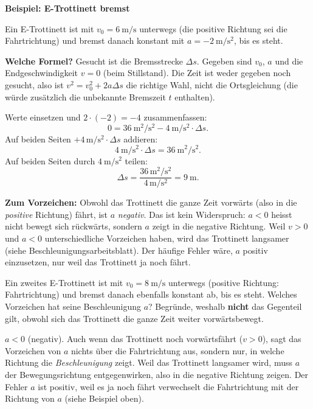 \documentclass[addpoints,11pt,a4paper]{exam}
\newenvironment{beispielbox}[1][Beispiel]{%
  \par\addvspace{10pt}\noindent\textbf{#1}\par\smallskip\noindent
}{%
  \par\addvspace{10pt}
}
\newlength{\antwortraumlen}
\newcommand{\Antwortraum}[1]{%
  \pgfmathsetlength{\antwortraumlen}{#1*2.5cm}%
  \begin{answerbox}
    \rule{0pt}{\antwortraumlen}%
  \end{answerbox}%
}
\begin{document}
\begin{beispielbox}[Beispiel: E-Trottinett bremst]
Ein E-Trottinett ist mit $v_0=\SI{6}{\meter\per\second}$ unterwegs (die
positive Richtung sei die Fahrtrichtung) und bremst danach konstant mit
$a=-\SI{2}{\meter\per\second\squared}$, bis es steht.

\textbf{Welche Formel?} Gesucht ist die Bremsstrecke $\Delta s$. Gegeben
sind $v_0$, $a$ und die Endgeschwindigkeit $v=0$ (beim Stillstand). Die
Zeit ist weder gegeben noch gesucht, also ist $v^2=v_0^2+2a\Delta s$ die
richtige Wahl, nicht die Ortsgleichung (die würde zusätzlich die
unbekannte Bremszeit $t$ enthalten).

Werte einsetzen und $2\cdot(-2)=-4$ zusammenfassen:
\[
  0 = \SI{36}{\meter\squared\per\second\squared} - \SI{4}{\meter\per\second\squared}\cdot\Delta s.
\]
Auf beiden Seiten $+4\,\si{\meter\per\second\squared}\cdot\Delta s$ addieren:
\[
  \SI{4}{\meter\per\second\squared}\cdot\Delta s = \SI{36}{\meter\squared\per\second\squared}.
\]
Auf beiden Seiten durch $\SI{4}{\meter\per\second\squared}$ teilen:
\[
  \Delta s = \frac{36\,\si{\meter\squared\per\second\squared}}{4\,\si{\meter\per\second\squared}} = \SI{9}{\meter}.
\]

\textbf{Zum Vorzeichen:} Obwohl das Trottinett die ganze Zeit vorwärts
(also in die \emph{positive} Richtung) fährt, ist $a$ \emph{negativ}. Das
ist kein Widerspruch: $a<0$ heisst nicht \glqq bewegt sich rückwärts\grqq{},
sondern \glqq $a$ zeigt in die negative Richtung\grqq{}. Weil $v>0$ und
$a<0$ unterschiedliche Vorzeichen haben, wird das Trottinett langsamer
(siehe Beschleunigungsarbeitsblatt). Der häufige Fehler wäre, $a$ positiv
einzusetzen, nur weil das Trottinett \glqq ja noch fährt\grqq{}.
\end{beispielbox}

\begin{questions}
\begin{taskbox}
\question[3] Ein zweites E-Trottinett ist mit
$v_0=\SI{8}{\meter\per\second}$ unterwegs (positive Richtung:
Fahrtrichtung) und bremst danach ebenfalls konstant ab, bis es steht.
Welches Vorzeichen hat seine Beschleunigung $a$? Begründe, weshalb
\textbf{nicht} das Gegenteil gilt, obwohl sich das Trottinett die ganze
Zeit weiter vorwärtsbewegt.
\Antwortraum{3}
\begin{solution}
$a<0$ (negativ). Auch wenn das Trottinett noch vorwärtsfährt ($v>0$),
sagt das Vorzeichen von $a$ nichts über die Fahrtrichtung aus, sondern
nur, in welche Richtung die \emph{Beschleunigung} zeigt. Weil das
Trottinett langsamer wird, muss $a$ der Bewegungsrichtung entgegenwirken,
also in die negative Richtung zeigen. Der Fehler \glqq $a$ ist positiv,
weil es ja noch fährt\grqq{} verwechselt die Fahrtrichtung mit der
Richtung von $a$ (siehe Beispiel oben).
\end{solution}
\end{taskbox}
\end{questions}
\end{document}
